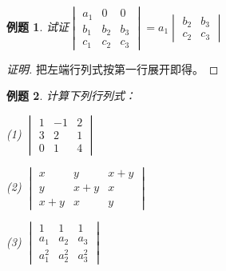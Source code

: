 \documentclass[a4paper]{book}
\newtheorem{eg}{例题}[chapter]
\newcommand{\enum}{\begin{list}{}{\setlength{\leftmargin}{0pt} \setlength{\itemindent}{2.5em} \setlength{\listparindent}{2em}}}
\begin{document}
\begin{eg}
试证$\begin{vmatrix} a_1 & 0 & 0 \\ b_1 & b_2 & b_3 \\ c_1 & c_2 & c_3 \end{vmatrix} = a_1 \begin{vmatrix} b_2 & b_3 \\ c_2 & c_3	 \end{vmatrix}$
\end{eg}
\begin{proof}[证明]
把左端行列式按第一行展开即得。
\end{proof}

\begin{eg}
计算下列行列式：
\enum
\item[(1)] $\begin{vmatrix} 1 & -1 & 2 \\ 3 & 2 & 1 \\ 0 & 1 & 4 \end{vmatrix}$
\item[(2)] $\begin{vmatrix} x & y & x+y \\ y & x+y & x \\ x+y & x & y \end{vmatrix}$
\item[(3)] $\begin{vmatrix} 1 & 1 & 1 \\ a_1 & a_2 & a_3 \\ a_1^2 & a_2^2 & a_3^2 \end{vmatrix}$
\end{list}
\end{eg}
\end{document}
